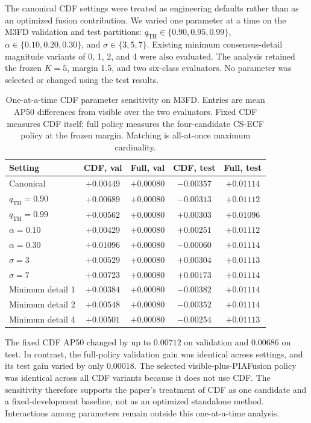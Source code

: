 \documentclass[11pt]{article}
\begin{document}
The canonical CDF settings were treated as engineering defaults rather than
as an optimized fusion contribution. We varied one parameter at a time on the
M3FD validation and test partitions: \(q_{\mathrm{TH}}\in\{0.90,0.95,0.99\}\),
\(\alpha\in\{0.10,0.20,0.30\}\), and
\(\sigma\in\{3,5,7\}\). Existing minimum consensus-detail magnitude variants
of 0, 1, 2, and 4 were also evaluated. The analysis retained the frozen
\(K=5\), margin 1.5, and two six-class evaluators. No parameter was selected
or changed using the test results.

\begin{table}[ht]
\centering
\small
\setlength{\tabcolsep}{3pt}
\caption{One-at-a-time CDF parameter sensitivity on M3FD. Entries are mean
AP50 differences from visible over the two evaluators. Fixed CDF measures CDF
itself; full policy measures the four-candidate CS-ECF policy at the frozen
margin. Matching is all-at-once maximum cardinality.}
\label{tab:cdf-sensitivity}
\begin{tabular}{@{}lcccc@{}}
\toprule
Setting & CDF, val & Full, val & CDF, test & Full, test \\
\midrule
Canonical & \(+0.00449\) & \(+0.00080\) &
\(-0.00357\) & \(+0.01114\) \\
\(q_{\mathrm{TH}}=0.90\) & \(+0.00689\) & \(+0.00080\) &
\(-0.00313\) & \(+0.01112\) \\
\(q_{\mathrm{TH}}=0.99\) & \(+0.00562\) & \(+0.00080\) &
\(+0.00303\) & \(+0.01096\) \\
\(\alpha=0.10\) & \(+0.00429\) & \(+0.00080\) &
\(+0.00251\) & \(+0.01112\) \\
\(\alpha=0.30\) & \(+0.01096\) & \(+0.00080\) &
\(-0.00060\) & \(+0.01114\) \\
\(\sigma=3\) & \(+0.00529\) & \(+0.00080\) &
\(+0.00304\) & \(+0.01113\) \\
\(\sigma=7\) & \(+0.00723\) & \(+0.00080\) &
\(+0.00173\) & \(+0.01114\) \\
Minimum detail 1 & \(+0.00384\) & \(+0.00080\) &
\(-0.00382\) & \(+0.01114\) \\
Minimum detail 2 & \(+0.00548\) & \(+0.00080\) &
\(-0.00352\) & \(+0.01114\) \\
Minimum detail 4 & \(+0.00501\) & \(+0.00080\) &
\(-0.00254\) & \(+0.01113\) \\
\bottomrule
\end{tabular}
\end{table}

The fixed CDF AP50 changed by up to \(0.00712\) on validation and
\(0.00686\) on test. In contrast, the full-policy validation gain was
identical across settings, and its test gain varied by only \(0.00018\).
The selected visible-plus-PIAFusion policy was identical across all CDF
variants because it does not use CDF. The sensitivity therefore supports the
paper's treatment of CDF as one candidate and a fixed-development baseline,
not as an optimized standalone method. Interactions among parameters remain
outside this one-at-a-time analysis.
\end{document}
